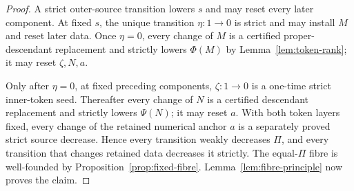 \documentclass[11pt]{article}
\begin{document}
\begin{proof}
A strict outer-source transition lowers $s$ and may reset every later
component.  At fixed $s$, the unique transition $\eta:1\to0$ is strict and
may install $M$ and reset later data.  Once $\eta=0$, every change of $M$ is
a certified proper-descendant replacement and strictly lowers $\Phi(M)$ by
Lemma~\ref{lem:token-rank}; it may reset $\zeta,N,a$.

Only after $\eta=0$, at fixed preceding components, $\zeta:1\to0$ is a
one-time strict inner-token seed.  Thereafter every change of $N$ is a
certified descendant replacement
and strictly lowers $\Psi(N)$; it may reset $a$.  With both token layers
fixed, every change of the retained numerical anchor $a$ is a separately
proved strict source decrease.  Hence every transition weakly decreases
$\Pi$, and every transition that changes retained data decreases it
strictly.  The equal-$\Pi$ fibre is well-founded by
Proposition~\ref{prop:fixed-fibre}.  Lemma~\ref{lem:fibre-principle} now
proves the claim.
\end{proof}
\end{document}
